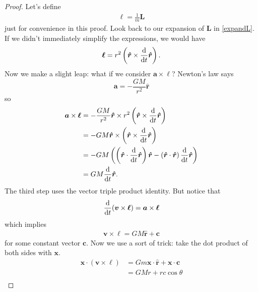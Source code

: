\begin{proof}
Let's define 
\begin{align}
    \bm \ell = \frac{1}{m}\bm{L}
\end{align}
just for convenience in this proof. Look back to our expansion of $\bm L$ in \ref{expandL}. If we didn't immediately simplify the expressions, we would have 
\begin{align}
    \bm \ell = r^2\left(\bm{\hat{r}} \times \frac{\mathrm{d}}{\mathrm{d}t}{\bm{\hat{r}}}\right).
\end{align}
Now we make a slight leap: what if we consider $\bm{a} \times \bm{\ell}$? Newton's law says 
\begin{equation}
    \bm a = -\frac{GM}{r^2} \bm{\hat{r}}
\end{equation}
so
\begin{align}
    \bm{a} \times \bm{\ell}  &= -\frac{GM}{r^2} \bm{\hat{r}} \times r^2\left(\bm{\hat{r}} \times \frac{\mathrm{d}}{\mathrm{d}t}{\bm{\hat{r}}}\right) \\
    &= -GM \bm{\hat{r}} \times \left(\bm{\hat{r}} \times \frac{\mathrm{d}}{\mathrm{d}t}{\bm{\hat{r}}}\right) \\
    &= -GM\left(\left(\bm{\hat{r}} \cdot \frac{\mathrm{d}}{\mathrm{d}t}{\bm{\hat{r}}}\right)\bm{\hat{r}} - \left(\bm{\hat{r}} \cdot \bm{\hat{r}}\right)\frac{\mathrm{d}}{\mathrm{d}t}{\bm{\hat{r}}}\right) \\
    &= GM\frac{\mathrm{d}}{\mathrm{d}t}{\bm{\hat{r}}}.
\end{align}
The third step uses the vector triple product identity. 
But notice that 
\begin{align}
    \frac{\mathrm{d}}{\mathrm{d}t}{\left(\bm v \times \bm \ell\right)} = \bm{a} \times \bm{\ell}
\end{align}
which implies 
\begin{align}
    \bm{v} \times \bm{\ell} = GM\bm{\hat{r}} + \bm c
\end{align}
for some constant vector $\bm c$. Now we use a sort of trick: take the dot product of both sides with $\bm x$.
\begin{align}
    \bm{x} \cdot \left(\bm{v} \times \bm{\ell}\right) &= Gm \bm{x}\cdot \bm{\hat{r}} + \bm{x}\cdot\bm{c} \\ 
    &= GMr + rc\cos\theta \\
\end{align}

\end{proof}
